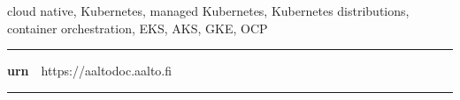 \begin{spacing}{.88}
{\parindent0pt %

\parbox[t]{123.6mm}{\raggedright\small cloud native, Kubernetes, managed Kubernetes, Kubernetes distributions, container orchestration, EKS, AKS, GKE, OCP}

\vspace{.5mm}\rule{\textwidth}{.75pt}

{\fontsize{10.5pt}{10.5pt}\bfseries\sffamily\lsstyle urn}~~{\small https://aaltodoc.aalto.fi}

\vspace{-2.4mm}\rule{\textwidth}{.75pt}

} %
\end{spacing}













